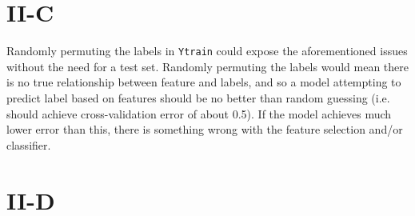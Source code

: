 \documentclass{article}
\begin{document}
\section*{II-C}

Randomly permuting the labels in \texttt{Ytrain} could expose the aforementioned
issues without the need for a test set. Randomly permuting the labels would mean
there is no true relationship between feature and labels, and so a model attempting
to predict label based on features should be no better than random guessing
(i.e. should achieve cross-validation error of about 0.5). 
If the model achieves much lower error than this,
there is something wrong with the feature selection and/or classifier.

\section*{II-D}
\end{document}
